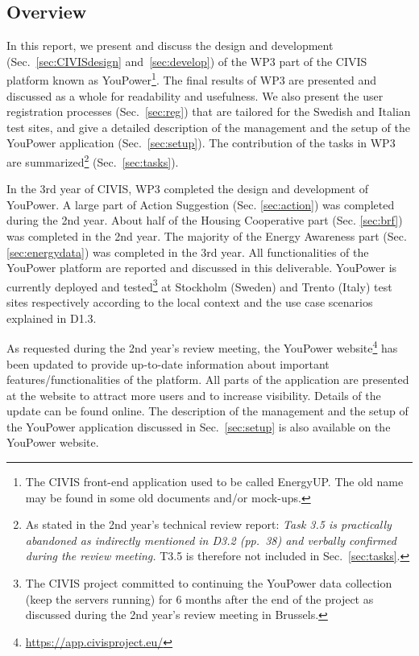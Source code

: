 \subsection{Overview}

In this report, we present and discuss the design and development (Sec.~\ref{sec:CIVISdesign} and~\ref{sec:develop}) of the WP3 part of the CIVIS platform known as YouPower\footnote{The CIVIS front-end application used to be called EnergyUP. The old name may be found in some old documents and/or mock-ups.}. 
The final results of WP3 are presented and discussed as a whole for readability and usefulness. 
% 
We also present the user registration processes (Sec.~\ref{sec:reg}) that are tailored for the Swedish and Italian test sites, and give a detailed description of the management and the setup of the YouPower application (Sec.~\ref{sec:setup}). The contribution of the tasks in WP3 are summarized\footnote{As stated in the 2nd year's technical review report: \textit{Task 3.5 is practically abandoned as indirectly mentioned in D3.2 (pp.~38) and verbally confirmed
during the review meeting.} T3.5 is therefore not included in Sec.~\ref{sec:tasks}.} (Sec.~\ref{sec:tasks}). 

In the 3rd year of CIVIS, WP3 completed the design and development of YouPower. A large part of Action Suggestion (Sec. \ref{sec:action}) was completed during the 2nd year. About half of the Housing Cooperative part (Sec. \ref{sec:brf}) was completed in the 2nd year. The majority of the Energy Awareness part (Sec. \ref{sec:energydata}) was completed in the 3rd year. 
All functionalities of the YouPower platform are reported and discussed in this deliverable. YouPower is currently deployed and tested\footnote{The CIVIS project committed to continuing the YouPower data collection (keep the servers running) for 6 months after the end of the project as discussed during the 2nd year's review meeting in Brussels.} at Stockholm (Sweden) and Trento (Italy) test sites respectively according to the local context and the use case scenarios explained in D1.3. 

As requested during the 2nd year's review meeting, the YouPower website\footnote{\url{https://app.civisproject.eu/}} has been updated to provide up-to-date information about important features/functionalities of the platform. All parts of the application are presented at the website to attract more users and to increase visibility.  Details of the update can be found online. The description of the management and the setup of the YouPower application discussed in Sec.~\ref{sec:setup} is also available on the YouPower website.

